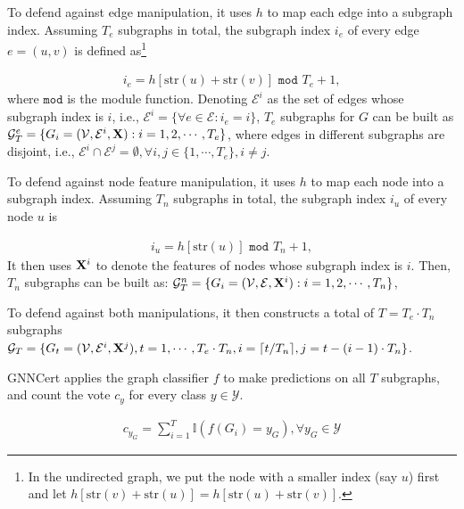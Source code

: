 To defend against edge manipulation, it uses 
$h$ to map each edge into a subgraph index.
Assuming $T_e$ subgraphs 
in total, the subgraph index $i_e$ of every edge $e=(u,v)$ is defined as\footnote{In the undirected graph, we put the node with a smaller index (say  $u$) first and let 
$h[\mathrm{str}(v) + \mathrm{str}(u)]=h[\mathrm{str}(u) + \mathrm{str}(v)]$.} 

{
\vspace{-4mm}
\begin{align}
\label{eqn:edgehash}
i_e = h[\mathrm{str}(u) + \mathrm{str}(v)] \, \, \texttt{mod} \, \, T_e+1, 
\end{align}
}%
where $\texttt{mod}$ is the module function. Denoting $\mathcal{E}^i$ as the set of edges whose subgraph index is $i$, i.e., $\mathcal{E}^i = \{\forall e \in \mathcal{E}: i_e= i \}$,  $T_e$ subgraphs for $G$ can be built as $\mathcal{G}^e_T = \{ {G}_i = (\mathcal{V},\mathcal{E}^i,{\bf X}): i=1,2,\cdots, T_e\}$, where edges in different subgraphs are disjoint, i.e., $\mathcal{E}^i \cap \mathcal{E}^j =  \emptyset, \forall i,j \in \{1, \cdots, T_e\}, i \neq j$. 

To defend against node feature manipulation, it 
 uses $h$ to map each node into a subgraph index. 
Assuming $T_n$ subgraphs in total, the subgraph index $i_u$ of every node $u$ is

{
\vspace{-4mm}
\begin{align}
\label{eqn:nodehash}
i_u = h[\mathrm{str}(u)] \, \, \texttt{mod} \, \, T_n+1, 
\end{align} 
}%
It then uses ${\bf X}^i$ to denote the features of nodes whose subgraph index is $i$. 
Then, $T_n$ subgraphs  can be built as: $\mathcal{G}^n_T = \{ {G}_i = (\mathcal{V},\mathcal{E},{\bf X}^i): i=1,2,\cdots, T_n\}$,

To defend against both manipulations, it then constructs a total of $T = T_e \cdot T_n$ subgraphs $\mathcal{G}_T = \{G_t = (\mathcal{V},\mathcal{E}^i,{\bf X}^j), t = 1, \cdots, T_e \cdot T_n, i=\lceil t/T_n\rceil, j=t-(i-1)\cdot T_n\}$. 


GNNCert applies the graph classifier $f$  to make predictions on all $T$ subgraphs, and count the vote $c_y$ for every class $y \in \mathcal{Y}$. 

{
\vspace{-4mm}
\begin{align}
c_{y_G} = \sum\nolimits_{i=1}^{T}\mathbb{I}(f(G_{i})=y_G), \forall y_G \in \mathcal{Y} \label{eqn:vote_GC} 
\end{align}
}%

